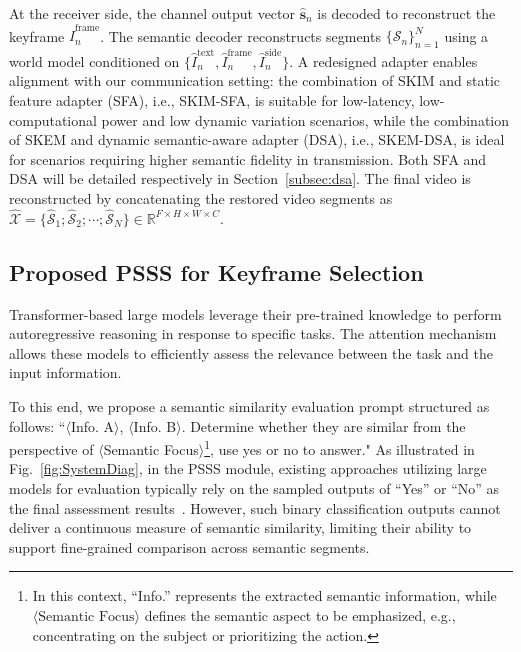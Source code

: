 \documentclass[10pt,journal]{IEEEtran}
\begin{document}
At the receiver side, the channel output vector $\hat{\mathbf{s}}_n$ is decoded to reconstruct the keyframe $\hat{I}^{\text{frame}}_n$. The semantic decoder reconstructs segments $\{\hat{\mathcal{S}}_n\}_{n=1}^N$ using a world model conditioned on $\{\hat{I}^{\text{text}}_n, \hat{I}^{\text{frame}}_n, \hat{I}^{\text{side}}_n\}$. A redesigned adapter enables alignment with our communication setting: the combination of SKIM and static feature adapter (SFA), i.e., SKIM-SFA, is suitable for low-latency, low-computational power and low dynamic variation scenarios, while the combination of SKEM and
dynamic semantic-aware adapter (DSA), i.e., SKEM-DSA, is ideal for scenarios requiring higher semantic fidelity in transmission. Both SFA and DSA will be detailed respectively in Section~\ref{subsec:dsa}. The final video is reconstructed by concatenating the restored video segments as
$\hat{\mathcal{X}} = \{\hat{\mathcal{S}}_1; \hat{\mathcal{S}}_2; \cdots; \hat{\mathcal{S}}_N\} \in \mathbb{R}^{F \times H \times W \times C}$.


\subsection{Proposed PSSS for Keyframe Selection}
\label{subsec:psss}

Transformer-based large models leverage their pre-trained knowledge to perform autoregressive reasoning in response to specific tasks. The attention mechanism allows these models to efficiently assess the relevance between the task and the input information.

To this end, we propose a semantic similarity evaluation prompt structured as follows: “$\langle$Info. A$\rangle$, $\langle$Info. B$\rangle$. Determine whether they are similar from the perspective of $\langle$Semantic Focus$\rangle$\footnote{In this context, “Info.” represents the extracted semantic information, while $\langle\text{Semantic Focus}\rangle$ defines the semantic aspect to be emphasized, e.g., concentrating on the subject or prioritizing the action.}, use yes or no to answer." As illustrated in Fig.~\ref{fig:SystemDiag}, in the PSSS module, existing approaches utilizing large models for evaluation typically rely on the sampled outputs of ``Yes'' or ``No'' as the final assessment results~\cite{TIFA}. However, such binary classification outputs cannot deliver a continuous measure of semantic similarity, limiting their ability to support fine-grained comparison across semantic segments.
\end{document}
